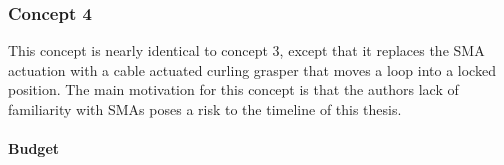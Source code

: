\subsubsection{Concept 4} 

This concept is nearly identical to concept 3, except that it replaces the SMA actuation with 
a cable actuated curling grasper that moves a loop into a locked position. The main motivation for this 
concept is that the authors lack of familiarity with SMAs poses a risk to the timeline of this thesis.


\paragraph{Budget}

\begin{table}[ht]
    \centering
    \caption{Estimated budget for the lock design with microspines.}
    \label{tab:lock_flex}



\end{table}
